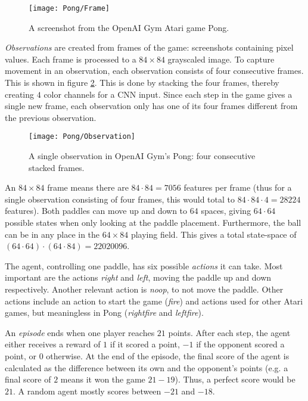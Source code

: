 \begin{figure}[h]
    \centering
    \texttt{[image: Pong/Frame]}
    \caption{A screenshot from the OpenAI Gym Atari game Pong.}
    \label{fig:pong-screen}
\end{figure}

\emph{Observations} are created from frames of the game: screenshots containing pixel values. Each frame is processed to a $84 \times 84$ grayscaled image. To capture movement in an observation, each observation consists of four consecutive frames. This is shown in figure \ref{fig:pong-obs}. This is done by stacking the four frames, thereby creating $4$ color channels for a CNN input. Since each step in the game gives a single new frame, each observation only has one of its four frames different from the previous observation.

\begin{figure}[h]
    \centering
    \texttt{[image: Pong/Observation]}
    \caption{A single observation in OpenAI Gym's Pong: four consecutive stacked frames.}
    \label{fig:pong-obs}
\end{figure}

An $84 \times 84$ frame means there are $ 84 \cdot 84 = 7056$ features per frame (thus for a single observation consisting of four frames, this would total to $84 \cdot 84 \cdot 4 = 28224$ features). Both paddles can move up and down to $64$ spaces, giving $64 \cdot 64$ possible states when only looking at the paddle placement. Furthermore, the ball can be in any place in the $64 \times 84$ playing field. This gives a total state-space of $(64 \cdot 64) \cdot (64 \cdot 84) = 22020096$. 

The agent, controlling one paddle, has six possible \emph{actions} it can take. Most important are the actions \textit{right} and \textit{left}, moving the paddle up and down respectively. Another relevant action is \textit{noop}, to not move the paddle. Other actions include an action to start the game (\textit{fire}) and actions used for other Atari games, but meaningless in Pong (\textit{rightfire} and \textit{leftfire}). 

An \emph{episode} ends when one player reaches $21$ points. After each step, the agent either receives a reward of $1$ if it scored a point, $-1$ if the opponent scored a point, or $0$ otherwise. At the end of the episode, the final score of the agent is calculated as the difference between its own and the opponent's points (e.g. a final score of $2$ means it won the game $21 - 19$). Thus, a perfect score would be $21$. A random agent mostly scores between $-21$ and $-18$.

